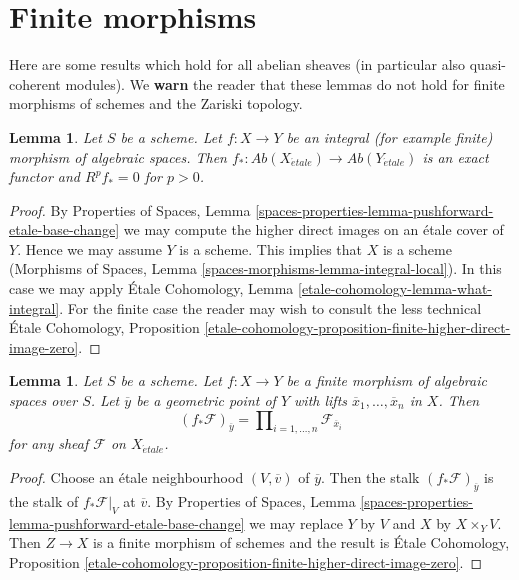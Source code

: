 \documentclass{stacks-project}
\theoremstyle{plain}
\newtheorem{lemma}[subsection]{Lemma}
\theoremstyle{definition}
\theoremstyle{remark}
\numberwithin{equation}{subsection}
\def\etale{{\acute{e}tale}}
\begin{document}
\section{Finite morphisms}
\label{section-finite-morphisms}

\noindent
Here are some results which hold for all abelian sheaves
(in particular also quasi-coherent modules).
We {\bf warn} the reader that these lemmas do not hold for
finite morphisms of schemes and the Zariski topology.

\begin{lemma}
\label{lemma-finite-higher-direct-image-zero}
Let $S$ be a scheme. Let $f : X \to Y$ be an integral (for example finite)
morphism of algebraic spaces. Then
$f_* : \textit{Ab}(X_\etale) \to \textit{Ab}(Y_\etale)$
is an exact functor and $R^pf_* = 0$ for $p > 0$.
\end{lemma}

\begin{proof}
By Properties of Spaces, Lemma
\ref{spaces-properties-lemma-pushforward-etale-base-change}
we may compute the higher direct images on an \'etale cover of $Y$.
Hence we may assume $Y$ is a scheme. This implies that
$X$ is a scheme (Morphisms of Spaces, Lemma
\ref{spaces-morphisms-lemma-integral-local}).
In this case we may apply
\'Etale Cohomology, Lemma \ref{etale-cohomology-lemma-what-integral}.
For the finite case the reader may wish to consult the less technical
\'Etale Cohomology, Proposition
\ref{etale-cohomology-proposition-finite-higher-direct-image-zero}.
\end{proof}

\begin{lemma}
\label{lemma-stalk-push-finite}
Let $S$ be a scheme. Let $f : X \to Y$ be a finite morphism of algebraic
spaces over $S$. Let $\overline{y}$ be a geometric point of $Y$ with
lifts $\overline{x}_1, \ldots, \overline{x}_n$ in $X$. Then
$$
(f_*\mathcal{F})_{\overline{y}} =
\prod\nolimits_{i = 1, \ldots, n}
\mathcal{F}_{\overline{x}_i}
$$
for any sheaf $\mathcal{F}$ on $X_\etale$.
\end{lemma}

\begin{proof}
Choose an \'etale neighbourhood $(V, \overline{v})$ of $\overline{y}$.
Then the stalk $(f_*\mathcal{F})_{\overline{y}}$
is the stalk of $f_*\mathcal{F}|_V$ at $\overline{v}$.
By Properties of Spaces,
Lemma \ref{spaces-properties-lemma-pushforward-etale-base-change}
we may replace $Y$ by $V$ and $X$ by $X \times_Y V$.
Then $Z \to X$ is a finite morphism of schemes and the result is
\'Etale Cohomology, Proposition
\ref{etale-cohomology-proposition-finite-higher-direct-image-zero}.
\end{proof}
\end{document}

